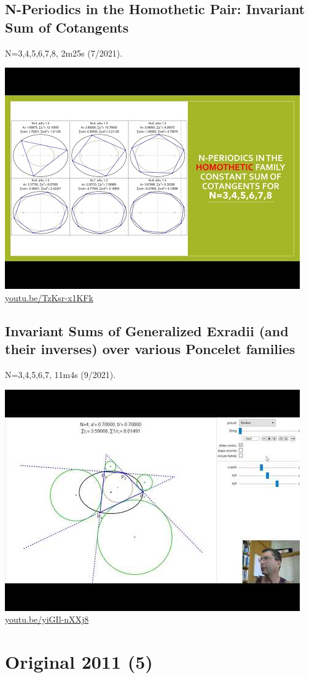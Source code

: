 \documentclass[12pt]{amsart}
\begin{document}
\subsection{N-Periodics in the Homothetic Pair: Invariant Sum of Cotangents}
\label{vid:TzKsr-x1KFk}
\noindent N=3,4,5,6,7,8, 2m25s (7/2021). 
\begin{center}\includegraphics[width=.5\textwidth]{pics/TzKsr-x1KFk.jpg} \\ 
\href{https://youtu.be/TzKsr-x1KFk}{\url{youtu.be/TzKsr-x1KFk}}\end{center}
% 

\subsection{Invariant Sums of Generalized Exradii (and their inverses) over various Poncelet families}
\label{vid:yiGIl-nXXj8}
\noindent N=3,4,5,6,7, 11m4s (9/2021). 
\begin{center}\includegraphics[width=.5\textwidth]{pics/yiGIl-nXXj8.jpg} \\ 
\href{https://youtu.be/yiGIl-nXXj8}{\url{youtu.be/yiGIl-nXXj8}}\end{center}
% 


\section{Original 2011 (5)}
\end{document}
